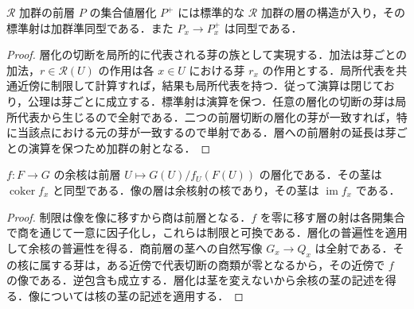 \begin{prop}[加群前層の層化]
$\mathcal R$ 加群の前層 $P$ の集合値層化 $P^+$ には標準的な $\mathcal R$ 加群の層の構造が入り，その標準射は加群準同型である．また $P_x\to P_x^+$ は同型である．
\end{prop}
\begin{proof}
層化の切断を局所的に代表される芽の族として実現する．加法は芽ごとの加法，$r\in\mathcal R(U)$ の作用は各 $x\in U$ における芽 $r_x$ の作用とする．局所代表を共通近傍に制限して計算すれば，結果も局所代表を持つ．従って演算は閉じており，公理は芽ごとに成立する．標準射は演算を保つ．任意の層化の切断の芽は局所代表から生じるので全射である．二つの前層切断の層化の芽が一致すれば，特に当該点における元の芽が一致するので単射である．層への前層射の延長は芽ごとの演算を保つため加群の射となる．
\end{proof}
\begin{prop}[層の余核及び像]
$f:F\to G$ の余核は前層 $U\mapsto G(U)/f_U(F(U))$ の層化である．その茎は $\operatorname{coker} f_x$ と同型である．像の層は余核射の核であり，その茎は $\operatorname{im}f_x$ である．
\end{prop}
\begin{proof}
制限は像を像に移すから商は前層となる．$f$ を零に移す層の射は各開集合で商を通じて一意に因子化し，これらは制限と可換である．層化の普遍性を適用して余核の普遍性を得る．商前層の茎への自然写像 $G_x\to Q_x$ は全射である．その核に属する芽は，ある近傍で代表切断の商類が零となるから，その近傍で $f$ の像である．逆包含も成立する．層化は茎を変えないから余核の茎の記述を得る．像については核の茎の記述を適用する．
\end{proof}
